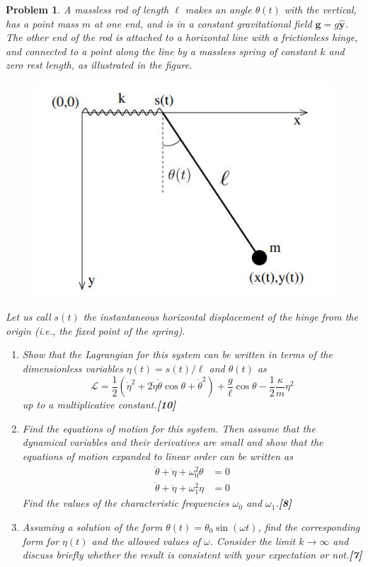 \documentclass[a4paper]{article}
\theoremstyle{new}
\newtheorem{qns}{Problem}[section]
\begin{document}
\begin{qns}
A massless rod of length $\ell$ makes an angle $\theta(t)$ with the vertical, has a point mass $m$ at one end, and is in a constant gravitational field $\mathbf{g} = g\mathbf{\hat{y}}$. The other end of the rod is attached to a horizontal line with a frictionless hinge, and connected to a point along the line by a massless spring of constant $k$ and zero rest length, as illustrated in the figure.
\begin{figure}[H]
    \centering
    \includegraphics[scale=0.5]{2018TP1Q2.JPG}
\end{figure}
Let us call $s(t)$ the instantaneous horizontal displacement of the hinge from the origin (i.e., the fixed point of the spring).
\begin{enumerate}[label=(\alph*)]
\item Show that the Lagrangian for this system can be written in terms of the dimensionless variables $\eta(t) = s(t)/\ell$ and $\theta(t)$ as
$$\mathcal{L}=\frac{1}{2}(\dot{\eta}^2+2\dot{\eta}\dot{\theta}\cos\theta+\dot{\theta}^2)+\frac{g}{\ell}\cos\theta-\frac{1}{2}\frac{\kappa}{m}\eta^2$$
up to a multiplicative constant.\hfill\textbf{[10]}
\item Find the equations of motion for this system. Then assume that the dynamical variables and their derivatives are small and show that the equations of motion expanded to linear order can be written as
\begin{align}
    \ddot{\theta}+\ddot{\eta}+\omega_0^2\theta&=0\nonumber\\\ddot{\theta}+\ddot{\eta}+\omega_1^2\eta&=0\nonumber
\end{align}
Find the values of the characteristic frequencies $\omega_0$ and $\omega_1$.\hfill\textbf{[8]}
\item Assuming a solution of the form $\theta(t) = \theta_0\sin(\omega t)$, find the corresponding form for $\eta(t)$ and the allowed values of $\omega$. Consider the limit $k\rightarrow\infty$ and discuss briefly whether the result is consistent with your expectation or not.\hfill\textbf{[7]}
\end{enumerate}
\end{qns}
\end{document}
